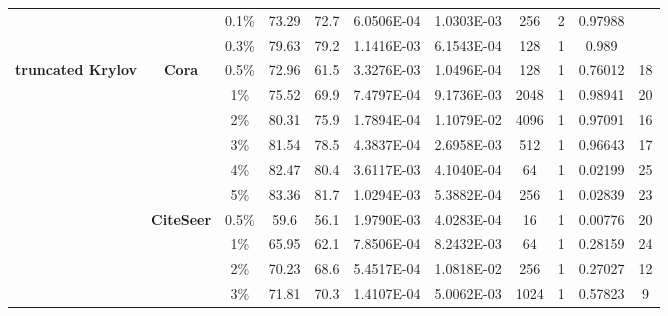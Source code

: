 \begin{table}[htbp]
\begin{tabular}{ccccc|cccccc}
          &       & 0.1\% & \cellcolor[rgb]{ .388,  .745,  .482}73.29 & \cellcolor[rgb]{ .973,  .412,  .42}72.7 & 6.0506E-04 & 1.0303E-03 & 256   & 2     & 0.97988 & ~ \\
          &       & 0.3\% & \cellcolor[rgb]{ .388,  .745,  .482}79.63 & \cellcolor[rgb]{ .973,  .412,  .42}79.2 & 1.1416E-03 & 6.1543E-04 & 128   & 1     & 0.989 & ~ \\
    \midrule
    \multirow{16}[2]{*}{\textbf{truncated Krylov}} & \multirow{6}[1]{*}{\textbf{Cora}} & 0.5\% & \cellcolor[rgb]{ .388,  .745,  .482}72.96 & \cellcolor[rgb]{ .973,  .412,  .42}61.5 & 3.3276E-03 & 1.0496E-04 & 128   & 1     & 0.76012 & 18 \\
          &       & 1\%   & \cellcolor[rgb]{ .388,  .745,  .482}75.52 & \cellcolor[rgb]{ .973,  .412,  .42}69.9 & 7.4797E-04 & 9.1736E-03 & 2048  & 1     & 0.98941 & 20 \\
          &       & 2\%   & \cellcolor[rgb]{ .388,  .745,  .482}80.31 & \cellcolor[rgb]{ .973,  .412,  .42}75.9 & 1.7894E-04 & 1.1079E-02 & 4096  & 1     & 0.97091 & 16 \\
          &       & 3\%   & \cellcolor[rgb]{ .388,  .745,  .482}81.54 & \cellcolor[rgb]{ .973,  .412,  .42}78.5 & 4.3837E-04 & 2.6958E-03 & 512   & 1     & 0.96643 & 17 \\
          &       & 4\%   & \cellcolor[rgb]{ .388,  .745,  .482}82.47 & \cellcolor[rgb]{ .973,  .412,  .42}80.4 & 3.6117E-03 & 4.1040E-04 & 64    & 1     & 0.02199 & 25 \\
          &       & 5\%   & \cellcolor[rgb]{ .388,  .745,  .482}83.36 & \cellcolor[rgb]{ .973,  .412,  .42}81.7 & 1.0294E-03 & 5.3882E-04 & 256   & 1     & 0.02839 & 23 \\
          & \multirow{6}[0]{*}{\textbf{CiteSeer}} & 0.5\% & \cellcolor[rgb]{ .388,  .745,  .482}59.6 & \cellcolor[rgb]{ .973,  .412,  .42}56.1 & 1.9790E-03 & 4.0283E-04 & 16    & 1     & 0.00776 & 20 \\
          &       & 1\%   & \cellcolor[rgb]{ .388,  .745,  .482}65.95 & \cellcolor[rgb]{ .973,  .412,  .42}62.1 & 7.8506E-04 & 8.2432E-03 & 64    & 1     & 0.28159 & 24 \\
          &       & 2\%   & \cellcolor[rgb]{ .388,  .745,  .482}70.23 & \cellcolor[rgb]{ .973,  .412,  .42}68.6 & 5.4517E-04 & 1.0818E-02 & 256   & 1     & 0.27027 & 12 \\
          &       & 3\%   & \cellcolor[rgb]{ .388,  .745,  .482}71.81 & \cellcolor[rgb]{ .973,  .412,  .42}70.3 & 1.4107E-04 & 5.0062E-03 & 1024  & 1     & 0.57823 & 9 \\

\end{tabular}
\end{table}

